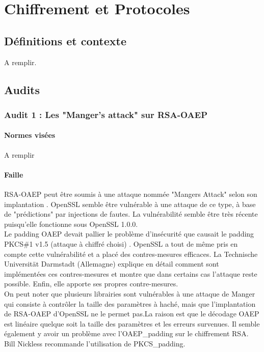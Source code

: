 \chapter{Chiffrement et Protocoles}

\section{Définitions et contexte}

A remplir.

\section{Audits}
	\subsection{Audit 1 : Les "Manger's attack" sur RSA-OAEP}
		\subsubsection{Normes visées}

		A remplir	
	
		\subsubsection{Faille}
		
			RSA-OAEP peut être soumis à une attaque nommée "Mangers Attack" selon son implantation \cite{mangers2010falko}. OpenSSL semble être vulnérable à une attaque de ce type, à base de "prédictions" par injections de fautes. La vulnérabilité semble être très récente puisqu'elle fonctionne sous OpenSSL 1.0.0.\\

			
			Le padding OAEP devait pallier le problème d'insécurité que causait le padding PKCS\#1 v1.5 (attaque à chiffré choisi) \cite{bleichenbacherPCKS}. OpenSSL a tout de même pris en compte cette vulnérabilité et a placé des contres-mesures efficaces.	La Technische Universität Darmstadt (Allemagne) explique en détail comment sont implémentées ces contres-mesures et montre que dans certains cas l'attaque reste possible. Enfin, elle apporte ses propres contre-mesures.\\
			
			On peut noter que plusieurs librairies sont vulnérables à une attaque de Manger qui consiste à contrôler la taille des paramètres à haché, mais que l'implantation de RSA-OAEP d'OpenSSL ne le permet pas.La raison est que le décodage OAEP est linéaire quelque soit la taille des paramètres et les erreurs survenues. 	Il semble également y avoir un problème avec l'OAEP\_padding sur le chiffrement RSA. Bill Nickless recommande l'utilisation de PKCS\_padding. \cite{sourceforgeRSAbroken}	\\
		
